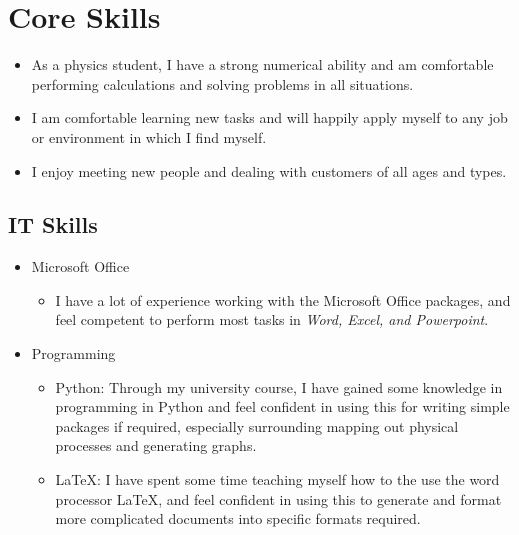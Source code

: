 \documentclass[10pt, a4paper]{article}
\begin{document}
\section{Core Skills}
\begin{itemize}
	\item As a physics student, I have a strong numerical ability and am comfortable performing calculations and solving problems in all situations.
	\item I am comfortable learning new tasks and will happily apply myself to any job or environment in which I find myself.
	\item I enjoy meeting new people and dealing with customers of all ages and types.
\end{itemize}
	\subsection{IT Skills}
	\begin{itemize}
		\item Microsoft Office
		\begin{itemize}
			\item I have a lot of experience working with the Microsoft Office packages, and feel competent to perform most tasks in \textit{Word, Excel, and Powerpoint}.
		\end{itemize}
		\item Programming
		\begin{itemize}
			\item Python: Through my university course, I have gained some knowledge in programming in Python and feel confident in using this for writing simple packages if required, especially surrounding mapping out physical processes and generating graphs.
			\item \LaTeX: I have spent some time teaching myself how to the use the word processor \LaTeX, and feel confident in using this to generate and format more complicated documents into specific formats required.
		\end{itemize}
	\end{itemize}
\end{document}
